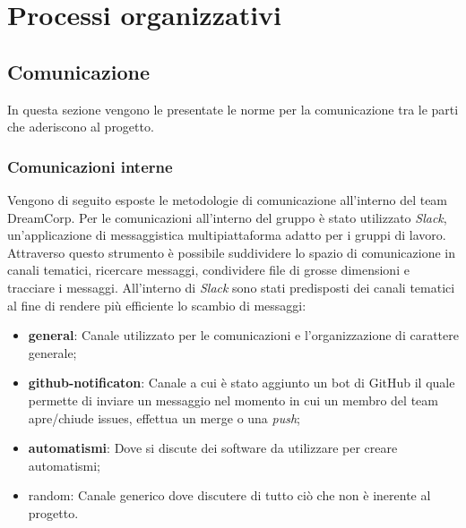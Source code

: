 \section{Processi organizzativi}
    \subsection{Comunicazione}
        In questa sezione vengono le presentate le norme per la comunicazione tra le parti che aderiscono al progetto.
        \subsubsection{Comunicazioni interne}
            Vengono di seguito esposte le metodologie di comunicazione all'interno del team DreamCorp.
            \newline
            Per le comunicazioni all'interno del gruppo è stato utilizzato \textit{Slack}, un'applicazione di messaggistica multipiattaforma adatto per i gruppi di lavoro. Attraverso questo strumento è possibile suddividere lo spazio di comunicazione in canali tematici, ricercare messaggi, condividere file di grosse dimensioni e tracciare i messaggi.
            \newline
            All'interno di \textit{Slack} sono stati predisposti dei canali tematici al fine di rendere più efficiente lo scambio di messaggi:
            \begin{itemize}
                \item \textbf{general}: Canale utilizzato per le comunicazioni e l'organizzazione di carattere generale;
                \item \textbf{github-notificaton}: Canale a cui è stato aggiunto un bot di GitHub il quale permette di inviare un messaggio nel momento in cui un membro del team apre/chiude issues, effettua un merge o una \textit{push};
                \item \textbf{automatismi}: Dove si discute dei software da utilizzare per creare automatismi;
                \item{random}: Canale generico dove discutere di tutto ciò che non è inerente al progetto.    
            \end{itemize}
            
